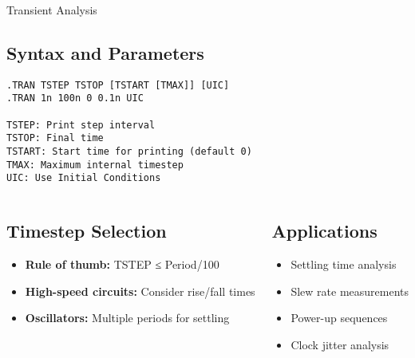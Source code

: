 \documentclass{beamer}
\begin{document}
\begin{frame}{Transient Analysis}
    \subsection{Syntax and Parameters}
    \begin{lstlisting}
.TRAN TSTEP TSTOP [TSTART [TMAX]] [UIC]
.TRAN 1n 100n 0 0.1n UIC

TSTEP: Print step interval
TSTOP: Final time
TSTART: Start time for printing (default 0)
TMAX: Maximum internal timestep
UIC: Use Initial Conditions
    \end{lstlisting}
    
    \begin{columns}
        \begin{column}{0.5\textwidth}
            \subsection{Timestep Selection}
            \begin{itemize}
                \item \textbf{Rule of thumb:} TSTEP ≤ Period/100
                \item \textbf{High-speed circuits:} Consider rise/fall times
                \item \textbf{Oscillators:} Multiple periods for settling
            \end{itemize}
        \end{column}
        \begin{column}{0.5\textwidth}
            \subsection{Applications}
            \begin{itemize}
                \item Settling time analysis
                \item Slew rate measurements
                \item Power-up sequences
                \item Clock jitter analysis
            \end{itemize}
        \end{column}
    \end{columns}
\end{frame}
\end{document}
